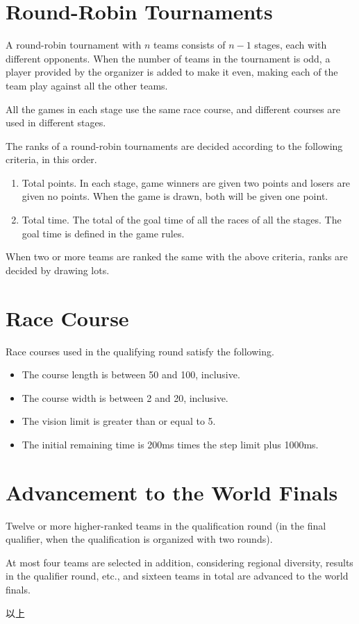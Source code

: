 \documentclass[11pt]{article}
\begin{document}
\section{Round-Robin Tournaments}
A round-robin tournament with $n$ teams consists of $n-1$ stages, each
with different opponents.  When the number of teams in the tournament
is odd, a player provided by the organizer is added to make it even,
making each of the team play against all the other teams.

All the games in each stage use the same race course, and different
courses are used in different stages.

The ranks of a round-robin tournaments are decided according to the
following criteria, in this order.
\begin{enumerate}
\item
  Total points.  In each stage, game winners are given two points and
  losers are given no points.  When the game is drawn, both will be
  given one point.
\item
  Total time.  The total of the goal time of all the races of all the
  stages.  The goal time is defined in the game rules.
\end{enumerate}
When two or more teams are ranked the same with the above criteria,
ranks are decided by drawing lots.

\section{Race Course}
Race courses used in the qualifying round satisfy the following.
\begin{itemize}
\item The course length is between 50 and 100, inclusive.
\item The course width is between 2 and 20, inclusive.
\item The vision limit is greater than or equal to 5.
\item The initial remaining time is 200ms times the step limit plus 1000ms.
\end{itemize}

\section{Advancement to the World Finals}
Twelve or more higher-ranked teams in the qualification round (in the
final qualifier, when the qualification is organized with two rounds).

At most four teams are selected in addition, considering regional
diversity, results in the qualifier round, etc., and sixteen teams in
total are advanced to the world finals.

\begin{flushright}
以上
\end{flushright}
\end{document}
